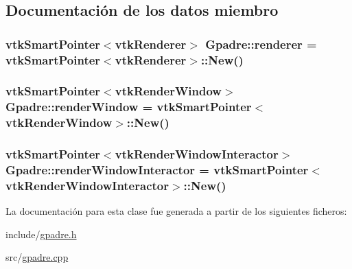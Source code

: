 \subsection{Documentación de los datos miembro}
\subsubsection[{\texorpdfstring{renderer}{renderer}}]{\setlength{\rightskip}{0pt plus 5cm}vtk\+Smart\+Pointer$<$vtk\+Renderer$>$ Gpadre\+::renderer = vtk\+Smart\+Pointer$<$vtk\+Renderer$>$\+::New()}\hypertarget{class_gpadre_acb2bafea1132fdda5e023edc5067c673}{}\label{class_gpadre_acb2bafea1132fdda5e023edc5067c673}
\subsubsection[{\texorpdfstring{render\+Window}{renderWindow}}]{\setlength{\rightskip}{0pt plus 5cm}vtk\+Smart\+Pointer$<$vtk\+Render\+Window$>$ Gpadre\+::render\+Window = vtk\+Smart\+Pointer$<$vtk\+Render\+Window$>$\+::New()\hspace{0.3cm}{\ttfamily [protected]}}\hypertarget{class_gpadre_af512cc11dc03408872e033cec640d8ba}{}\label{class_gpadre_af512cc11dc03408872e033cec640d8ba}
\subsubsection[{\texorpdfstring{render\+Window\+Interactor}{renderWindowInteractor}}]{\setlength{\rightskip}{0pt plus 5cm}vtk\+Smart\+Pointer$<$vtk\+Render\+Window\+Interactor$>$ Gpadre\+::render\+Window\+Interactor = vtk\+Smart\+Pointer$<$vtk\+Render\+Window\+Interactor$>$\+::New()\hspace{0.3cm}{\ttfamily [protected]}}\hypertarget{class_gpadre_a31b647d46719088a5cb59688cdb2fe8a}{}\label{class_gpadre_a31b647d46719088a5cb59688cdb2fe8a}


La documentación para esta clase fue generada a partir de los siguientes ficheros\+:\begin{DoxyCompactItemize}
\item 
include/\hyperlink{gpadre_8h}{gpadre.\+h}\item 
src/\hyperlink{gpadre_8cpp}{gpadre.\+cpp}\end{DoxyCompactItemize}
